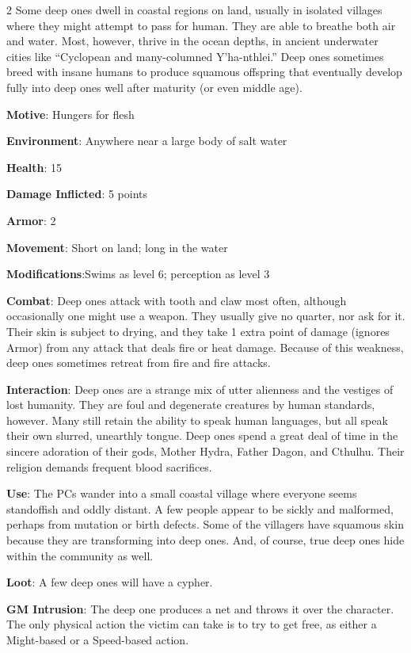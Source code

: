 \begin{multicols}{2}
Some deep ones dwell in coastal regions on land, usually in isolated villages where they might attempt to pass for human. They are able to breathe both air and water. Most, however, thrive in the ocean depths, in ancient underwater cities like “Cyclopean and many-columned Y’ha-nthlei.” Deep ones sometimes breed with insane humans to produce squamous offspring that eventually develop fully into deep ones well after maturity (or even middle age).

\textbf{Motive}: Hungers for flesh

\textbf{Environment}: Anywhere near a large body of salt water 

\textbf{Health}: 15

\textbf{Damage Inflicted}: 5 points

\textbf{Armor}: 2

\textbf{Movement}: Short on land; long in the water

\textbf{Modifications}:Swims as level 6; perception as level 3

\textbf{Combat}: Deep ones attack with tooth and claw most often, although occasionally one might use a weapon. They usually give no quarter, nor ask for it. Their skin is subject to drying, and they take 1 extra point of damage (ignores Armor) from any attack that deals fire or heat damage. Because of this weakness, deep ones sometimes retreat from fire and fire attacks.

\textbf{Interaction}: Deep ones are a strange mix of utter alienness and the vestiges of lost humanity. They are foul and degenerate creatures by human standards, however. Many still retain the ability to speak human languages, but all speak their own slurred, unearthly tongue.
Deep ones spend a great deal of time in the sincere adoration of their gods, Mother Hydra, Father Dagon, and Cthulhu. Their religion demands frequent blood sacrifices.

\textbf{Use}: The PCs wander into a small coastal village where everyone seems standoffish and oddly distant. A few people appear to be sickly and malformed, perhaps from mutation or birth defects. Some of the villagers have squamous skin because they are transforming into deep ones. And, of course, true deep ones hide within the community as well.

\textbf{Loot}: A few deep ones will have a cypher.

\textbf{GM Intrusion}: The deep one produces a net and throws it over the character. The only physical action the victim can take is to try to get free, as either a Might-based or a Speed-based action.


\end{multicols}

